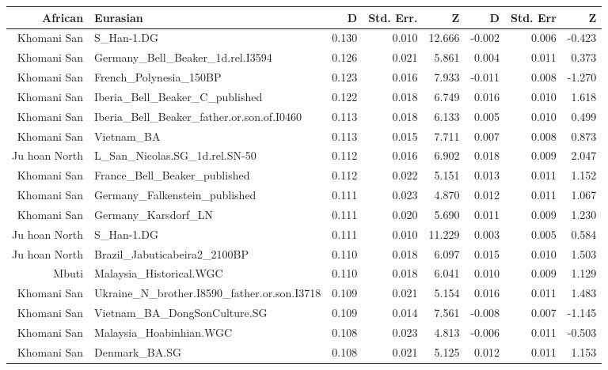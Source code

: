 \begin{table}[ht]
\centering
\begin{tabular}{rlrrrrrr}
  \hline
African & Eurasian & D & Std. Err. & Z & D & Std. Err & Z \\ 
  \hline
Khomani San & S\_Han-1.DG & 0.130 & 0.010 & 12.666 & -0.002 & 0.006 & -0.423 \\ 
  Khomani San & Germany\_Bell\_Beaker\_1d.rel.I3594 & 0.126 & 0.021 & 5.861 & 0.004 & 0.011 & 0.373 \\ 
  Khomani San & French\_Polynesia\_150BP & 0.123 & 0.016 & 7.933 & -0.011 & 0.008 & -1.270 \\ 
  Khomani San & Iberia\_Bell\_Beaker\_C\_published & 0.122 & 0.018 & 6.749 & 0.016 & 0.010 & 1.618 \\ 
  Khomani San & Iberia\_Bell\_Beaker\_father.or.son.of.I0460 & 0.113 & 0.018 & 6.133 & 0.005 & 0.010 & 0.499 \\ 
  Khomani San & Vietnam\_BA & 0.113 & 0.015 & 7.711 & 0.007 & 0.008 & 0.873 \\ 
  Ju hoan North & L\_San\_Nicolas.SG\_1d.rel.SN-50 & 0.112 & 0.016 & 6.902 & 0.018 & 0.009 & 2.047 \\ 
  Khomani San & France\_Bell\_Beaker\_published & 0.112 & 0.022 & 5.151 & 0.013 & 0.011 & 1.152 \\ 
  Khomani San & Germany\_Falkenstein\_published & 0.111 & 0.023 & 4.870 & 0.012 & 0.011 & 1.067 \\ 
  Khomani San & Germany\_Karsdorf\_LN & 0.111 & 0.020 & 5.690 & 0.011 & 0.009 & 1.230 \\ 
  Ju hoan North & S\_Han-1.DG & 0.111 & 0.010 & 11.229 & 0.003 & 0.005 & 0.584 \\ 
  Ju hoan North & Brazil\_Jabuticabeira2\_2100BP & 0.110 & 0.018 & 6.097 & 0.015 & 0.010 & 1.503 \\ 
  Mbuti & Malaysia\_Historical.WGC & 0.110 & 0.018 & 6.041 & 0.010 & 0.009 & 1.129 \\ 
  Khomani San & Ukraine\_N\_brother.I8590\_father.or.son.I3718 & 0.109 & 0.021 & 5.154 & 0.016 & 0.011 & 1.483 \\ 
  Khomani San & Vietnam\_BA\_DongSonCulture.SG & 0.109 & 0.014 & 7.561 & -0.008 & 0.007 & -1.145 \\ 
  Khomani San & Malaysia\_Hoabinhian.WGC & 0.108 & 0.023 & 4.813 & -0.006 & 0.011 & -0.503 \\ 
  Khomani San & Denmark\_BA.SG & 0.108 & 0.021 & 5.125 & 0.012 & 0.011 & 1.153 \\ 

\end{tabular}
\end{table}
